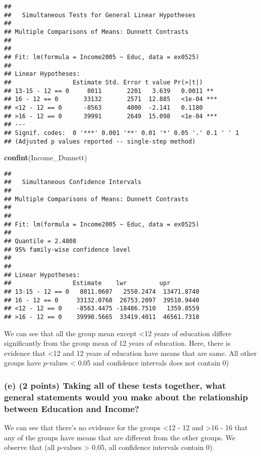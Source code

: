 \documentclass[]{article}
\newenvironment{Shaded}{\begin{snugshade}}{\end{snugshade}}
\newcommand{\KeywordTok}[1]{\textcolor[rgb]{0.13,0.29,0.53}{\textbf{#1}}}
\newcommand{\NormalTok}[1]{#1}
\begin{document}
\begin{verbatim}
## 
##   Simultaneous Tests for General Linear Hypotheses
## 
## Multiple Comparisons of Means: Dunnett Contrasts
## 
## 
## Fit: lm(formula = Income2005 ~ Educ, data = ex0525)
## 
## Linear Hypotheses:
##                 Estimate Std. Error t value Pr(>|t|)    
## 13-15 - 12 == 0     8011       2201   3.639   0.0011 ** 
## 16 - 12 == 0       33132       2571  12.885   <1e-04 ***
## <12 - 12 == 0      -8563       4000  -2.141   0.1180    
## >16 - 12 == 0      39991       2649  15.098   <1e-04 ***
## ---
## Signif. codes:  0 '***' 0.001 '**' 0.01 '*' 0.05 '.' 0.1 ' ' 1
## (Adjusted p values reported -- single-step method)
\end{verbatim}

\begin{Shaded}
\begin{Highlighting}[]
\KeywordTok{confint}\NormalTok{(Income_Dunnett)}
\end{Highlighting}
\end{Shaded}

\begin{verbatim}
## 
##   Simultaneous Confidence Intervals
## 
## Multiple Comparisons of Means: Dunnett Contrasts
## 
## 
## Fit: lm(formula = Income2005 ~ Educ, data = ex0525)
## 
## Quantile = 2.4808
## 95% family-wise confidence level
##  
## 
## Linear Hypotheses:
##                 Estimate    lwr         upr        
## 13-15 - 12 == 0   8011.0607   2550.2474  13471.8740
## 16 - 12 == 0     33132.0768  26753.2097  39510.9440
## <12 - 12 == 0    -8563.4475 -18486.7510   1359.8559
## >16 - 12 == 0    39990.5665  33419.4011  46561.7318
\end{verbatim}

We can see that all the group mean except \textless{}12 years of
education differe significantly from the group mean of 12 years of
education. Here, there is evidence that \textless{}12 and 12 years of
education have means that are same. All other groups have \(p\)-values
\textless{} 0.05 and confidence intervals does not contain 0)

\subsubsection{(e) (2 points) Taking all of these tests together, what
general statements would you make about the relationship between
Education and
Income?}\label{e-2-points-taking-all-of-these-tests-together-what-general-statements-would-you-make-about-the-relationship-between-education-and-income}

We can see that there's no evidence for the groups \textless{}12 - 12
and \textgreater{}16 - 16 that any of the groups have means that are
different from the other groups. We observe that (all \(p\)-values
\textgreater{} 0.05, all confidence intervals contain 0).
\end{document}
